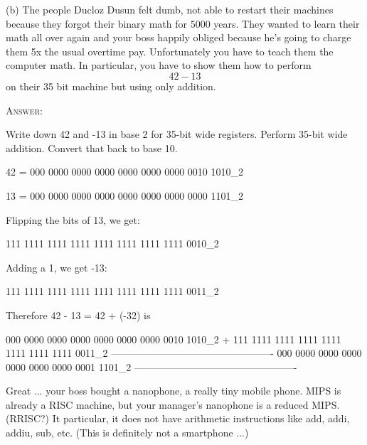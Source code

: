 (b) The people Ducloz Dusun felt dumb,
not able to restart their machines because they forgot their binary math for
$5000$ years.
They wanted to learn their math all over again and your boss happily obliged
because he's going to charge them 5x the usual overtime pay.
Unfortunately you have to teach them the computer math.
In particular, you have to show them how to perform
\[
42 - 13
\]
on their 35 bit machine but using only addition.

\textsc{Answer:}
\begin{answercode}
Write down 42 and -13 in base 2 for 35-bit wide registers.
Perform 35-bit wide addition. Convert that back to base 10.

    42 =  000 0000 0000 0000 0000 0000 0000 0010 1010_2

    13 =  000 0000 0000 0000 0000 0000 0000 0000 1101_2

Flipping the bits of 13, we get:

    111 1111 1111 1111 1111 1111 1111 1111 0010_2

Adding a 1, we get -13:

    111 1111 1111 1111 1111 1111 1111 1111 0011_2

Therefore 42 - 13 = 42 + (-32) is

       000 0000 0000 0000 0000 0000 0000 0010 1010_2
	+  111 1111 1111 1111 1111 1111 1111 1111 0011_2
	-------------------------------------------------
	   000 0000 0000 0000 0000 0000 0000 0001 1101_2
	-------------------------------------------------

\end{answercode}

\newpage
\nextq
Great ... your boss bought a nanophone, a really tiny mobile phone.
MIPS is already a RISC machine, but your manager's nanophone is a reduced MIPS.
(RRISC?)
It particular, it does not have arithmetic instructions like add, addi, addiu,
sub, etc. (This is definitely not a smartphone ...)

